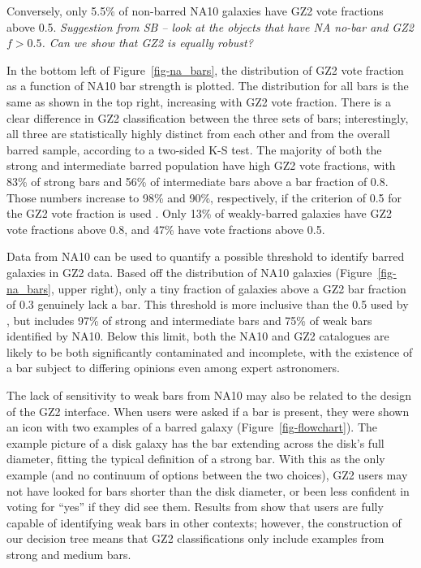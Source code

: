 \documentclass[useAMS,usenatbib]{mn2e}
\begin{document}
Conversely, only 5.5\% of non-barred NA10 galaxies have GZ2 vote fractions above 0.5. {\em Suggestion from SB -- look at the objects that have NA no-bar and GZ2 $f > 0.5$. Can we show that GZ2 is equally robust?}

In the bottom left of Figure~\ref{fig-na_bars}, the distribution of GZ2 vote fraction as a function of NA10 bar strength is plotted. The distribution for all bars is the same as shown in the top right, increasing with GZ2 vote fraction. There is a clear difference in GZ2 classification between the three sets of bars; interestingly, all three are statistically highly distinct from each other and from the overall barred sample, according to a two-sided K-S test. The majority of both the strong and intermediate barred population have high GZ2 vote fractions, with 83\% of strong bars and 56\% of intermediate bars above a bar fraction of 0.8. Those numbers increase to 98\% and 90\%, respectively, if the criterion of 0.5 for the GZ2 vote fraction is used \citep{mas11c}. Only 13\% of weakly-barred galaxies have GZ2 vote fractions above 0.8, and 47\% have vote fractions above 0.5. 

Data from NA10 can be used to quantify a possible threshold to identify barred galaxies in GZ2 data. Based off the distribution of NA10 galaxies (Figure~\ref{fig-na_bars}, upper right), only a tiny fraction of galaxies above a GZ2 bar fraction of 0.3 genuinely lack a bar. This threshold is more inclusive than the 0.5 used by \citet{mas11c}, but includes 97\% of strong and intermediate bars and 75\% of weak bars identified by NA10. Below this limit, both the NA10 and GZ2 catalogues are likely to be both significantly contaminated and incomplete, with the existence of a bar subject to differing opinions even among expert astronomers. 

The lack of sensitivity to weak bars from NA10 may also be related to the design of the GZ2 interface. When users were asked if a bar is present, they were shown an icon with two examples of a barred galaxy (Figure~\ref{fig-flowchart}). The example picture of a disk galaxy has the bar extending across the disk's full diameter, fitting the typical definition of a strong bar. With this as the only example (and no continuum of options between the two choices), GZ2 users may not have looked for bars shorter than the disk diameter, or been less confident in voting for ``yes'' if they did see them. Results from \citet{hoy11} show that users are fully capable of identifying weak bars in other contexts; however, the construction of our decision tree means that GZ2 classifications only include examples from strong and medium bars. 
\end{document}
